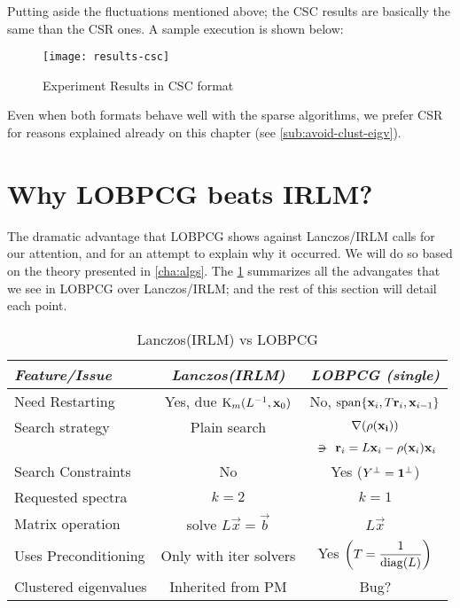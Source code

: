 Putting aside the fluctuations mentioned above; the CSC results are
basically the same than the CSR ones. A sample execution is shown
below: 

\begin{figure}[H]
  \centering
  \caption{Experiment Results in CSC format}   
  \texttt{[image: results-csc]}
\end{figure}

Even when both formats behave well with the sparse algorithms, we
prefer CSR for reasons explained already on this chapter (see
\cref{sub:avoid-clust-eigv}). 

\section{Why \gls{LOBPCG} beats \gls{IRLM}?}
\label{sec:why-lobpcg}

The dramatic advantage that \gls{LOBPCG} shows against
Lanczos/\gls{IRLM} calls for our attention, and for an attempt to
explain why it occurred. We will do so based on the theory presented
in \cref{cha:algs}. The \cref{tab:lanczos-vs-lobpcg} summarizes all
the advangates 
that we see in \gls{LOBPCG} over Lanczos/\gls{IRLM}; and the rest of
this section will detail each point.

\begin{table}[h]  
  \caption{Lanczos(IRLM) vs LOBPCG}\label{tab:lanczos-vs-lobpcg}
  \begin{tabular}{| l | c | c | }
    \hline
    \emph{Feature/Issue} & \emph{Lanczos(IRLM)} & \emph{LOBPCG (single)} \\
    \hline \hline
    Need Restarting &
    Yes, due $\Krylov{\inv{L}}{\vec{x}_0}{m}$ &
    No, $\func{span} \{\vec{x}_i, T\vec{r}_i, \vec{x}_{i-1}\}$ \\
    \hline
    Search strategy &
    Plain search &
    $\nabla (\func{\rho}(\vec{x_i}))$ \\
    &
    &
    $\suchthat \vec{r}_i = L\vec{x}_i - \func{\rho}(\vec{x}_i)\vec{x}_i$\\
    \hline
    Search Constraints &
    No &
    Yes ($\ortc{Y} = \ortc{\vec{1}}$) \\
    \hline
    Requested spectra &
    $k=2$ &
    $k=1$ \\      
    \hline
    Matrix operation &
    solve $L\vec{x} = \vec{b}$ &
    $L\vec{x}$ \\
    \hline      
    Uses Preconditioning &
    Only with iter solvers &
    Yes $\left(T = \dfrac{1}{\func{diag}(L)} \right)$ \\
    \hline
    Clustered eigenvalues &
    Inherited from PM &
    Bug? \\      
    \hline
  \end{tabular}
\end{table}

